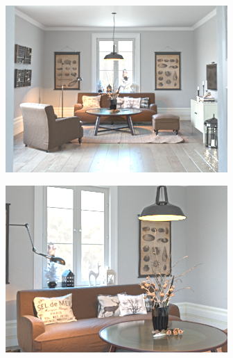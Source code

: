 \begin{figure}
  \centering
  \begin{subfigure}{0.4\linewidth}
    \includegraphics[width=\linewidth]{praca/images/AI43_008_Cam01.png}
  \end{subfigure}
  \begin{subfigure}{0.4\linewidth}
    \includegraphics[width=\linewidth]{praca/images/AI43_008_Cam03.png}
  \end{subfigure}
  \begin{subfigure}{0.4\linewidth}

\end{subfigure}
\end{figure}
